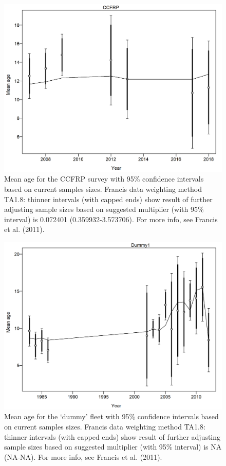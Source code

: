 \documentclass[12pt,]{article}
\begin{document}
\begin{figure}
\centering
\includegraphics{r4ss/plots_mod1/comp_condAALfit_data_weighting_TA1.8_condAgeCCFRP.png}
\caption{Mean age for the CCFRP survey with 95\% confidence intervals
based on current samples sizes. Francis data weighting method TA1.8:
thinner intervals (with capped ends) show result of further adjusting
sample sizes based on suggested multiplier (with 95\% interval) is
0.072401 (0.359932-3.573706). For more info, see Francis et al. (2011).
\label{fig:comp_condAALfit_data_weighting_TA1.8_condAgeCCFRP}}
\end{figure}

\begin{figure}
\centering
\includegraphics{r4ss/plots_mod1/comp_condAALfit_data_weighting_TA1.8_condAgeDummy1.png}
\caption{Mean age for the `dummy' fleet with 95\% confidence intervals
based on current samples sizes. Francis data weighting method TA1.8:
thinner intervals (with capped ends) show result of further adjusting
sample sizes based on suggested multiplier (with 95\% interval) is NA
(NA-NA). For more info, see Francis et al. (2011).
\label{fig:comp_condAALfit_data_weighting_TA1.8_condAgeDummy1}}
\end{figure}
\end{document}
